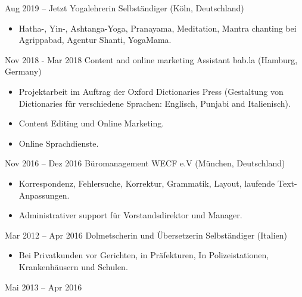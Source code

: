 \documentclass[a4paper,]{fortysecondscv}
\begin{document}
\begin{cvtable}[3]
		\cvitem
			{Aug 2019 -- Jetzt}
			{Yogalehrerin}
			{Selbständiger (Köln, Deutschland)}
			{				
				\vspace{-\topsep}
				\begin{itemize}[nosep, leftmargin=0pt] %
					\item Hatha-, Yin-, Ashtanga-Yoga, Pranayama, Meditation, Mantra chanting bei Agrippabad, Agentur Shanti, YogaMama.
				\end{itemize}
			}
		\cvitem
			{Nov 2018 - Mar 2018}
			{Content and online marketing Assistant}
			{bab.la  (Hamburg, Germany)}
			{
				\vspace{-\topsep}
				\begin{itemize}[nosep, leftmargin=0pt] %
					\item Projektarbeit im Auftrag der Oxford Dictionaries Press (Gestaltung von Dictionaries für verschiedene Sprachen: Englisch, Punjabi and Italienisch). 
					\item Content Editing und Online Marketing.
					\item Online Sprachdienste.
				\end{itemize}
			}
		\cvitem
			{Nov 2016 -- Dez 2016}
			{Büromanagement}
			{WECF e.V (München, Deutschland)}
			{
				\vspace{-\topsep}
				\begin{itemize}[nosep, leftmargin=0pt] %
  					\item Korrespondenz, Fehlersuche, Korrektur, Grammatik, Layout, laufende Text-Anpassungen. 				  
  					\item Administrativer support für Vorstandsdirektor und Manager.
				\end{itemize}
			}
		\cvitem
			{Mar 2012 -- Apr 2016}
			{Dolmetscherin und Übersetzerin}
			{Selbständiger (Italien)}
			{				
				\vspace{-\topsep}
				\begin{itemize}[nosep, leftmargin=0pt] %
					\item Bei Privatkunden vor Gerichten, in Präfekturen, In Polizeistationen, Krankenhäusern und Schulen.
				\end{itemize}
			}
		\cvitem
			{Mai 2013 -- Apr 2016}

\end{cvtable}
\end{document}
